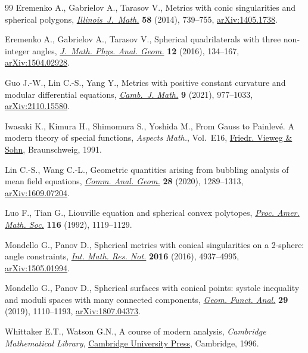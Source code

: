 \documentclass[11pt]{article}
\numberwithin{equation}{section}
\numberwithin{equation}{section}
\begin{document}
\begin{thebibliography}{99}
Eremenko A., Gabrielov A., Tarasov V., Metrics with conic singularities and
 spherical polygons, \href{https://doi.org/10.1215/ijm/1441790388}{\textit{Illinois~J.~Math.}} \textbf{58} (2014), 739--755,
 \href{https://arxiv.org/abs/1405.1738}{arXiv:1405.1738}.

Eremenko A., Gabrielov A., Tarasov V., Spherical quadrilaterals with three
 non-integer angles, \href{https://doi.org/10.15407/mag12.02.134}{\textit{J.~Math. Phys. Anal. Geom.}} \textbf{12} (2016),
 134--167, \href{https://arxiv.org/abs/1504.02928}{arXiv:1504.02928}.

Guo J.-W., Lin C.-S., Yang Y., Metrics with positive constant curvature and
 modular differential equations, \href{https://doi.org/10.4310/CJM.2021.v9.n4.a3}{\textit{Camb.~J. Math.}} \textbf{9} (2021),
 977--1033, \href{https://arxiv.org/abs/2110.15580}{arXiv:2110.15580}.

Iwasaki K., Kimura H., Shimomura S., Yoshida M., From {G}auss to {P}ainlev\'e.
 A modern theory of special functions, \textit{Aspects Math.}, Vol.~E16,
 \href{https://doi.org/10.1007/978-3-322-90163-7}{Friedr. Vieweg \& Sohn}, Braunschweig, 1991.

Lin C.-S., Wang C.-L., Geometric quantities arising from bubbling analysis of
 mean field equations, \href{https://doi.org/10.4310/CAG.2020.v28.n6.a2}{\textit{Comm. Anal. Geom.}} \textbf{28} (2020),
 1289--1313, \href{https://arxiv.org/abs/1609.07204}{arXiv:1609.07204}.

Luo F., Tian G., Liouville equation and spherical convex polytopes,
 \href{https://doi.org/10.2307/2159498}{\textit{Proc. Amer. Math. Soc.}} \textbf{116} (1992), 1119--1129.

Mondello G., Panov D., Spherical metrics with conical singularities on a
 2-sphere: angle constraints, \href{https://doi.org/10.1093/imrn/rnv300}{\textit{Int. Math. Res. Not.}} \textbf{2016}
 (2016), 4937--4995, \href{https://arxiv.org/abs/1505.01994}{arXiv:1505.01994}.

Mondello G., Panov D., Spherical surfaces with conical points: systole
 inequality and moduli spaces with many connected components, \href{https://doi.org/10.1007/s00039-019-00506-3}{\textit{Geom.
 Funct. Anal.}} \textbf{29} (2019), 1110--1193, \href{https://arxiv.org/abs/1807.04373}{arXiv:1807.04373}.

Whittaker E.T., Watson G.N., A course of modern analysis, \textit{Cambridge Mathematical Library}, \href{https://doi.org/10.1017/CBO9780511608759}{Cambridge University Press}, Cambridge, 1996.

\end{thebibliography}
\end{document}
